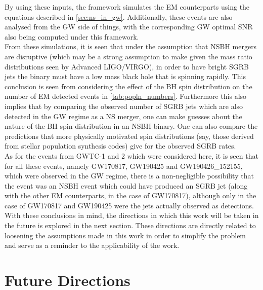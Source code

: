     By using these inputs, the framework simulates the EM counterparts using the
    equations described in \ref{sec:ns_in_gw}.  Additionally, these events are also
    analysed from the GW side of things, with the corresponding GW optimal SNR also
    being computed under this framework.\\
    From these simulations, it is seen that under the assumption that NSBH mergers are
    disruptive (which may be a strong assumption to make given the mass ratio
    distributions seen by Advanced LIGO/VIRGO), in order to have bright SGRB jets the
    binary must have a low mass black hole that is spinning rapidly. This conclusion is
    seen from considering the effect of the BH spin distribution on the number of EM
    detected events in \ref{tab:popln_numbers}. Furthermore this also implies that by
    comparing the observed number of SGRB jets which are also detected in the GW regime
    as a NS merger, one can make guesses about the nature of the BH spin distribution in
    an NSBH binary. One can also compare the predictions that more physically motivated
    spin distributions (say, those derived from stellar population synthesis codes) give
    for the observed SGRB rates.\\
    As for the events from GWTC-1 and 2 which were considered here, it is seen that for
    all these events, namely GW170817, GW190425 and GW190426\_152155, which were
    observed in the GW regime, there is a non-negligible possibility that the event was
    an NSBH event which could have produced an SGRB jet (along with the other EM
    counterparts, in the case of GW170817), although only in the case of GW170817 and
    GW190425 were the jets actually observed as detections.\\
    With these conclusions in mind, the directions in which this work will be taken in
    the future is explored in the next section. These directions are directly related to
    loosening the assumptions made in this work in order to simplify the problem and
    serve as a reminder to the applicability of the work.

    \section{Future Directions}


